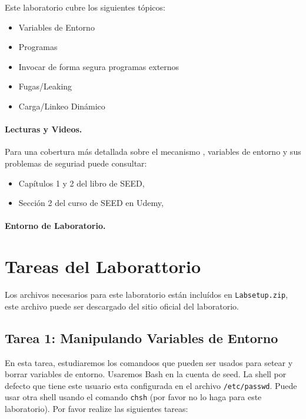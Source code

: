 Este laboratorio cubre los siguientes tópicos:

\begin{itemize}[noitemsep]
\item Variables de Entorno
\item Programas \setuid
\item Invocar de forma segura programas externos
\item Fugas/Leaking
\item Carga/Linkeo Dinámico
\end{itemize}


\paragraph{Lecturas y Videos.}
Para una cobertura más detallada sobre el mecanismo \setuid, variables de entorno y sus problemas de seguriad puede consultar:

\begin{itemize}
\item Capítulos 1 y 2 del libro de SEED, \seedbook
\item Sección 2 del curso de SEED en Udemy, \seedcsvideo
\end{itemize}

\paragraph{Entorno de Laboratorio.} \seedenvironmentC





\section{Tareas del Laborattorio}

Los archivos necesarios para este laboratorio están incluídos en \texttt{Labsetup.zip}, este archivo puede ser descargado del sitio oficial del laboratorio.


\subsection{Tarea 1: Manipulando Variables de Entorno}

En esta tarea, estudiaremos los comandoos que pueden ser usados para setear y borrar variables de entorno. Usaremos Bash en la cuenta de seed. La shell por defecto que tiene este usuario esta configurada en el archivo {\tt /etc/passwd}. Puede usar otra shell usando el comando {\tt chsh} (por favor no lo haga para este laboratorio). Por favor realize las siguientes tareas:

